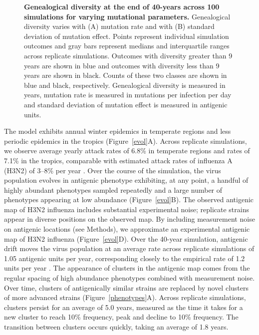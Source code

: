 \documentclass[11pt,oneside,letterpaper]{article}
\begin{document}
\begin{figure}[tb]
	\centering		
	\caption{\textbf{Genealogical diversity at the end of 40-years across 100 simulations for varying mutational parameters.} Genealogical diversity varies with (A) mutation rate and with (B) standard deviation of mutation effect.  Points represent individual simulation outcomes and gray bars represent medians and interquartile ranges across replicate simulations.  Outcomes with diversity greater than 9 years are shown in blue and outcomes with diversity less than 9 years are shown in black.  Counts of these two classes are shown in blue and black, respectively.  Genealogical diversity is measured in years, mutation rate is measured in mutations per infection per day and standard deviation of mutation effect is measured in antigenic units.}
	\label{param}
\end{figure}

The model exhibits annual winter epidemics in temperate regions and less periodic epidemics in the tropics (Figure~\ref{evol}A).  Across replicate simulations, we observe average yearly attack rates of 6.8\% in temperate regions and rates of 7.1\% in the tropics, comparable with estimated attack rates of influenza A (H3N2) of 3--8\% per year \cite{Monto93,Koelle09}.  Over the course of the simulation, the virus population evolves in antigenic phenotype exhibiting, at any point, a handful of highly abundant phenotypes sampled repeatedly and a large number of phenotypes appearing at low abundance (Figure~\ref{evol}B).  The observed antigenic map of H3N2 influenza includes substantial experimental noise; replicate strains appear in diverse positions on the observed map.  By including measurement noise on antigenic locations (see Methods), we approximate an experimental antigenic map of H3N2 influenza (Figure~\ref{evol}D).  Over the 40-year simulation, antigenic drift moves the virus population at an average rate across replicate simulations of 1.05 antigenic units per year, corresponding closely to the empirical rate of 1.2 units per year \cite{Smith04}. The appearance of clusters in the antigenic map comes from the regular spacing of high abundance phenotypes combined with measurement noise.  Over time, clusters of antigenically similar strains are replaced by novel clusters of more advanced strains (Figure~\ref{phenotypes}A).  Across replicate simulations, clusters persist for an average of 5.0 years, measured as the time it takes for a new cluster to reach 10\% frequency, peak and decline to 10\% frequency.  The transition between clusters occurs quickly, taking an average of 1.8 years.
\end{document}
